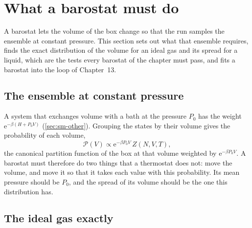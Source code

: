 \section{What a barostat must do}
\label{sec:pr-npt}

A barostat lets the volume of the box change so that the run samples the
ensemble at constant pressure. This section sets out what that ensemble
requires, finds the exact distribution of the volume for an ideal gas and
its spread for a liquid, which are the tests every barostat of the
chapter must pass, and fits a barostat into the loop of Chapter~13.

\subsection*{The ensemble at constant pressure}

A system that exchanges volume with a bath at the pressure $P_0$ has the
weight $\mathrm{e}^{-\beta(H + P_0V)}$ (\cref{sec:sm-other}). Grouping the
states by their volume gives the probability of each volume,
\begin{equation*}
   \mathcal{P}(V) \propto \mathrm{e}^{-\beta P_0V}\,Z(N, V, T) ,
\end{equation*}
the canonical partition function of the box at that volume weighted by
$\mathrm{e}^{-\beta P_0V}$. A barostat must therefore do two things that a
thermostat does not: move the volume, and move it so that it takes each
value with this probability. Its mean pressure should be $P_0$, and the
spread of its volume should be the one this distribution has.

\subsection*{The ideal gas exactly}


